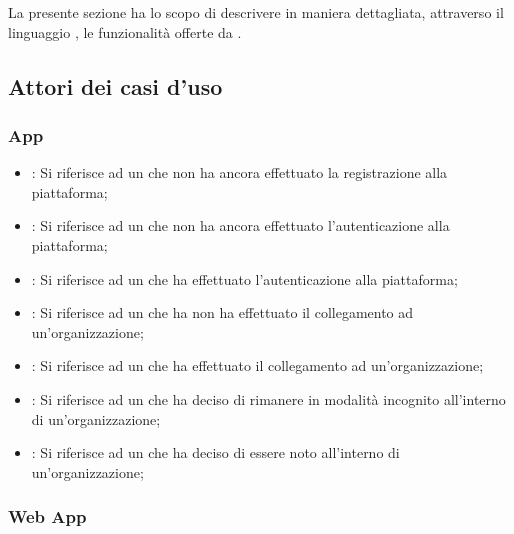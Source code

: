 \documentclass[../analisi-dei-requisiti]{subfiles}
\begin{document}
La presente sezione ha lo scopo di descrivere in maniera dettagliata, attraverso il linguaggio , le funzionalità offerte da .

\subsection{Attori dei casi d'uso}%
\label{sub:attori_casi_duso}

\subsubsection{App}%
\label{subsub:utenti}

\begin{itemize}
  \item \textbf{}: Si riferisce ad un  che non ha ancora effettuato la registrazione alla piattaforma;
  \item \textbf{}: Si riferisce ad un  che non ha ancora effettuato l'autenticazione alla piattaforma;
  \item \textbf{}: Si riferisce ad un  che ha effettuato l'autenticazione alla piattaforma;
  \item \textbf{}: Si riferisce ad un  che ha non ha effettuato il collegamento ad un'organizzazione;
  \item \textbf{}: Si riferisce ad un  che ha effettuato il collegamento ad un'organizzazione;
  \item \textbf{}: Si riferisce ad un  che ha deciso di rimanere in modalità incognito all'interno di un'organizzazione;
  \item \textbf{}: Si riferisce ad un  che ha deciso di essere noto all'interno di un'organizzazione;
\end{itemize}

\subsubsection{Web App}%
\label{subsub:super_utenti}
\end{document}
